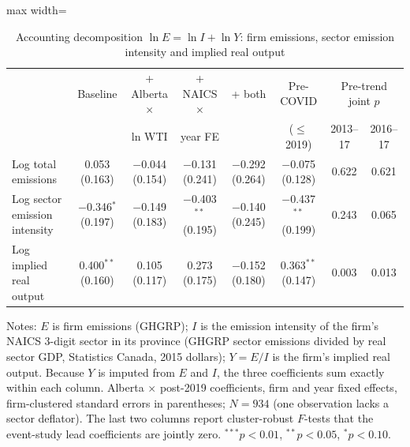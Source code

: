 \begin{table}[htbp]\centering\footnotesize
\caption{Accounting decomposition $\ln E=\ln I+\ln Y$: firm emissions, sector emission intensity and implied real output}
\label{tab:decomp}
\begin{adjustbox}{max width=\textwidth}
\begin{tabular}{lccccccc}
\toprule
 & Baseline & + Alberta $\times$ & + NAICS $\times$ & + both & Pre-COVID & \multicolumn{2}{c}{Pre-trend joint $p$} \\
 & & ln WTI & year FE & & ($\leq$2019) & 2013--17 & 2016--17 \\
\midrule
Log total emissions & 0.053 (0.163) & $-$0.044 (0.154) & $-$0.131 (0.241) & $-$0.292 (0.264) & $-$0.075 (0.128) & 0.622 & 0.621 \\
Log sector emission intensity & $-$0.346$^{*}$ (0.197) & $-$0.149 (0.183) & $-$0.403$^{**}$ (0.195) & $-$0.140 (0.245) & $-$0.437$^{**}$ (0.199) & 0.243 & 0.065 \\
Log implied real output & 0.400$^{**}$ (0.160) & 0.105 (0.117) & 0.273 (0.175) & $-$0.152 (0.180) & 0.363$^{**}$ (0.147) & 0.003 & 0.013 \\
\bottomrule
\end{tabular}
\end{adjustbox}
\par\vspace{3pt}\begin{minipage}{\textwidth}\footnotesize
Notes: $E$ is firm emissions (GHGRP); $I$ is the emission intensity of the firm's NAICS 3-digit sector in its province (GHGRP sector emissions divided by real sector GDP, Statistics Canada, 2015 dollars); $Y=E/I$ is the firm's implied real output. Because $Y$ is imputed from $E$ and $I$, the three coefficients sum exactly within each column. Alberta $\times$ post-2019 coefficients, firm and year fixed effects, firm-clustered standard errors in parentheses; $N=934$ (one observation lacks a sector deflator). The last two columns report cluster-robust $F$-tests that the event-study lead coefficients are jointly zero. $^{***}p<0.01$, $^{**}p<0.05$, $^{*}p<0.10$.
\end{minipage}
\end{table}
